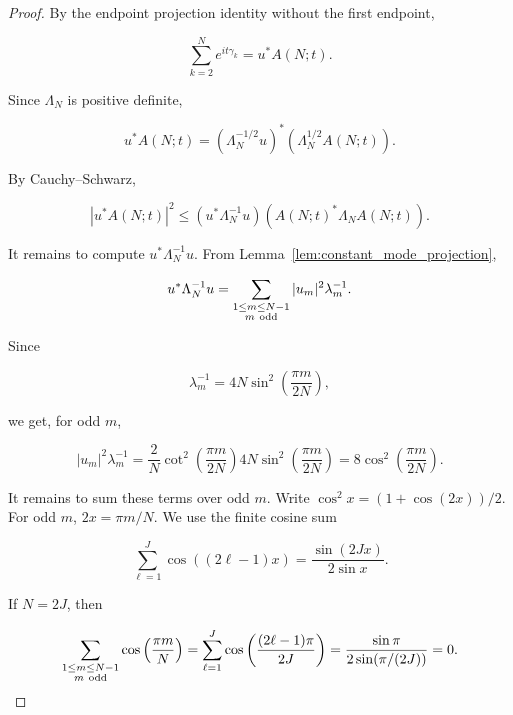 \documentclass[11pt]{amsart}
\numberwithin{equation}{section}
\theoremstyle{plain}
\theoremstyle{definition}
\theoremstyle{remark}
\begin{document}
\begin{proof}
By the endpoint projection identity without the first endpoint,

\begin{equation}
\sum_{k=2}^{N}e^{it\gamma_k}
=
u^*A(N;t).
\label{eq:endpoint_without_first_uA}
\end{equation}

Since \(\Lambda_N\) is positive definite,

\begin{equation}
u^*A(N;t)
=
(\Lambda_N^{-1/2}u)^*
(\Lambda_N^{1/2}A(N;t)).
\end{equation}

By Cauchy--Schwarz,

\begin{equation}
|u^*A(N;t)|^2
\le
(u^*\Lambda_N^{-1}u)
(A(N;t)^*\Lambda_NA(N;t)).
\label{eq:green_deweighting_cauchy}
\end{equation}

It remains to compute \(u^*\Lambda_N^{-1}u\). From
Lemma~\ref{lem:constant_mode_projection},

\begin{equation}
u^*\Lambda_N^{-1}u
=
\sum_{\substack{1\le m\le N-1\\m\ {\rm odd}}}
|u_m|^2\lambda_m^{-1}.
\end{equation}

Since

\begin{equation}
\lambda_m^{-1}
=
4N\sin^2\left(\frac{\pi m}{2N}\right),
\end{equation}

we get, for odd \(m\),

\begin{equation}
|u_m|^2\lambda_m^{-1}
=
\frac2N
\cot^2\left(\frac{\pi m}{2N}\right)
4N
\sin^2\left(\frac{\pi m}{2N}\right)
=
8\cos^2\left(\frac{\pi m}{2N}\right).
\end{equation}

It remains to sum these terms over odd \(m\). Write
\(\cos^2 x=(1+\cos(2x))/2\). For odd \(m\),
\(2x=\pi m/N\). We use the finite cosine sum

\begin{equation}
\sum_{\ell=1}^{J}\cos((2\ell-1)x)
=
\frac{\sin(2Jx)}{2\sin x}.
\end{equation}

If \(N=2J\), then

\begin{equation}
\sum_{\substack{1\le m\le N-1\\m\ {\rm odd}}}
\cos\left(\frac{\pi m}{N}\right)
=
\sum_{\ell=1}^{J}
\cos\left(\frac{(2\ell-1)\pi}{2J}\right)
=
\frac{\sin \pi}{2\sin(\pi/(2J))}
=
0.
\end{equation}


\end{proof}
\end{document}
